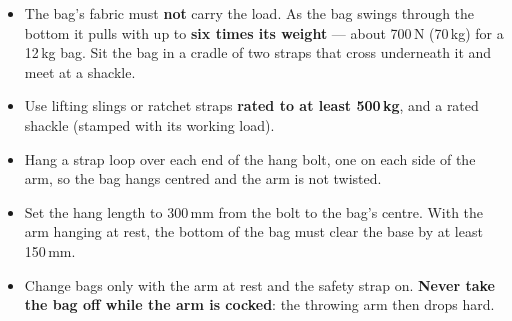 \documentclass[11pt,a4paper]{article}
\begin{document}
\begin{minipage}[t]{0.50\linewidth}
\vspace{0pt}
\begin{itemize}[itemsep=2pt, leftmargin=1.2em, topsep=1pt]
  \item The bag's fabric must \textbf{not} carry the load. As the bag swings through the bottom it pulls with up to \textbf{six times its weight} --- about 700\,N (70\,kg) for a 12\,kg bag. Sit the bag in a cradle of two straps that cross underneath it and meet at a shackle.
  \item Use lifting slings or ratchet straps \textbf{rated to at least 500\,kg}, and a rated shackle (stamped with its working load).
  \item Hang a strap loop over each end of the hang bolt, one on each side of the arm, so the bag hangs centred and the arm is not twisted.
  \item Set the hang length to 300\,mm from the bolt to the bag's centre. With the arm hanging at rest, the bottom of the bag must clear the base by at least 150\,mm.
  \item Change bags only with the arm at rest and the safety strap on. \textbf{Never take the bag off while the arm is cocked}: the throwing arm then drops hard.
\end{itemize}
\end{minipage}
\end{document}
